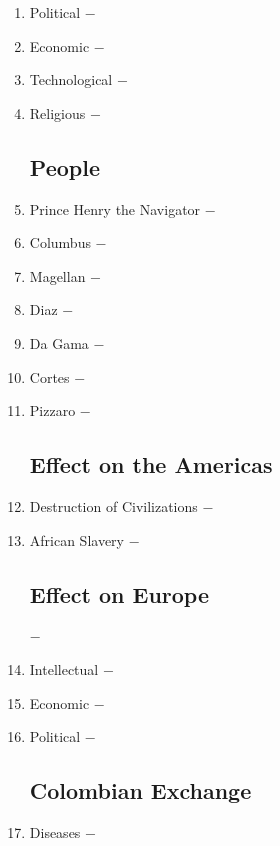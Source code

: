 \documentclass[12pt]{article}
\begin{document}
\begin{enumerate}
\item Political $-$

\item Economic $-$

\item Technological $-$

\item Religious $-$

\subsection{People}

\item Prince Henry the Navigator $-$

\item Columbus $-$

\item Magellan $-$

\item Diaz $-$

\item Da Gama $-$

\item Cortes $-$

\item Pizzaro $-$

\subsection{Effect on the Americas}

\item Destruction of Civilizations $-$

\item African Slavery $-$

\subsection{Effect on Europe} $-$

\item Intellectual $-$

\item Economic $-$

\item Political $-$

\subsection{Colombian Exchange} 

\item Diseases $-$ 


\end{enumerate}
\end{document}
